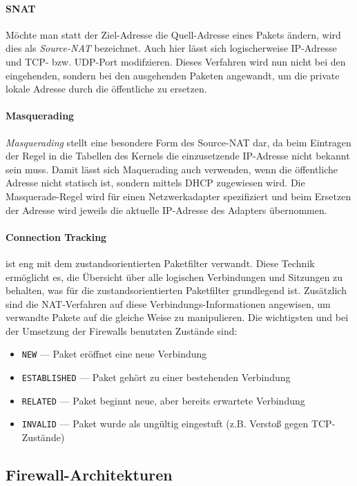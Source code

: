 \paragraph{SNAT}
Möchte man statt der Ziel-Adresse die Quell-Adresse eines Pakets ändern, wird
dies als \emph{Source-NAT} bezeichnet.
Auch hier lässt sich logischerweise IP-Adresse und TCP- bzw. UDP-Port
modifzieren.
Dieses Verfahren wird nun nicht bei den eingehenden, sondern bei den ausgehenden
Paketen angewandt, um die private lokale Adresse durch die öffentliche zu
ersetzen.

\paragraph{Masquerading}
\emph{Masquerading} stellt eine besondere Form des Source-NAT dar, da beim
Eintragen der Regel in die Tabellen des Kernels die einzusetzende IP-Adresse
nicht bekannt sein muss.
Damit lässt sich Maquerading auch verwenden, wenn die öffentliche Adresse nicht
statisch ist, sondern mittels DHCP zugewiesen wird.
Die Masquerade-Regel wird für einen Netzwerkadapter spezifiziert und beim
Ersetzen der Adresse wird jeweils die aktuelle IP-Adresse des Adapters
übernommen.

\paragraph{Connection Tracking} ist eng mit dem zustandsorientierten Paketfilter
verwandt.
Diese Technik ermöglicht es, die Übersicht über alle logischen Verbindungen und
Sitzungen zu behalten, was für die zustandsorientierten Paketfilter grundlegend
ist.
Zusätzlich sind die NAT-Verfahren auf diese Verbindungs-Informationen angewisen,
um verwandte Pakete auf die gleiche Weise zu manipulieren.
Die wichtigsten und bei der Umsetzung der Firewalls benutzten Zustände sind:
\begin{itemize}
\item {\tt NEW} --- Paket eröffnet eine neue Verbindung
\item {\tt ESTABLISHED} --- Paket gehört zu einer bestehenden Verbindung
\item {\tt RELATED} --- Paket beginnt neue, aber bereits erwartete Verbindung
\item {\tt INVALID} --- Paket wurde als ungültig eingestuft (z.B. Verstoß gegen
      TCP-Zustände)
\end{itemize}


\subsection{Firewall-Architekturen}

